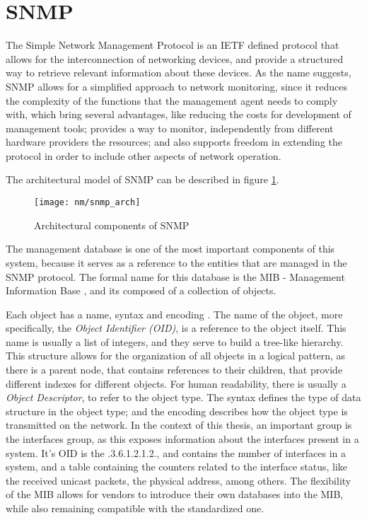 \section {SNMP}

The Simple Network Management Protocol is an IETF defined protocol that allows for the interconnection of networking devices, and provide a structured way to retrieve relevant information about these devices. As the name suggests,
SNMP allows for a simplified approach to network monitoring, since it reduces the complexity of the functions that the management agent needs to comply with, which bring several advantages, like reducing
the costs for development of management tools; provides a way to monitor, independently from different hardware providers the resources; and also supports freedom in extending the protocol in order to include other aspects of 
network operation. \cite{CITE - RFC 1157} %
\par  The architectural model of SNMP can be described in figure \ref{fig:snmp}.
    
\begin{figure} [!htbp]
    \centering
    \texttt{[image: nm/snmp\_arch]}
    \caption{Architectural components of SNMP}
    \label{fig:snmp}
\end{figure}

The management database is one of the most important components of this system, because it serves as a reference to the entities that are managed in the SNMP protocol. The formal name for this database is the MIB - Management 
Information Base \cite {CITE - RFC 1155}, and its composed of a collection of objects.

\par Each object has a name, syntax and encoding \cite {CITE - RFC 1156}. The name of the object, more specifically, the \textit {Object Identifier (OID)}, is a reference to the object itself. This name is usually a 
list of integers, and they serve to build a tree-like hierarchy. This structure allows for the organization of all objects in a logical pattern, as there is a parent node, that contains references to their children, 
that provide different indexes for different objects. For human readability, there is usually a \textit {Object Descriptor}, to refer to the object type. The syntax defines the type of data structure in the object type; and 
the encoding describes how the object type is transmitted on the network. In the context of this thesis, an important group is the interfaces group, as this exposes information about the interfaces present in a system. It's OID 
is the .3.6.1.2.1.2., and contains the number of interfaces in a system, and a table containing the counters related to the interface status, like the received unicast packets, the physical address, among others. The flexibility of
the MIB allows for vendors to introduce their own databases into the MIB, while also remaining compatible with the standardized one.

